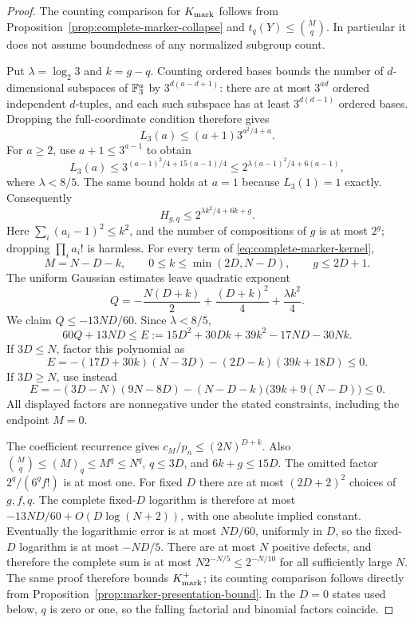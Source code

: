 \begin{proof}
The counting comparison for $K_{\rm mark}$ follows from
Proposition~\ref{prop:complete-marker-collapse} and
$t_q(Y)\leq\binom Mq$. In particular it does not assume boundedness
of any normalized subgroup count.

Put $\lambda=\log_2 3$ and $k=g-q$. Counting ordered bases bounds
the number of $d$-dimensional subspaces of $\mathbb F_3^a$ by
$3^{d(a-d+1)}$: there are at most $3^{ad}$ ordered independent
$d$-tuples, and each such subspace has at least $3^{d(d-1)}$
ordered bases. Dropping the full-coordinate condition therefore gives
\[
 L_3(a)\leq(a+1)3^{a^2/4+a}.
\]
For $a\geq2$, use $a+1\leq3^{a-1}$ to obtain
\[
 L_3(a)\leq3^{(a-1)^2/4+15(a-1)/4}
       \leq2^{\lambda(a-1)^2/4+6(a-1)},
\]
where $\lambda<8/5$. The same bound holds at $a=1$ because
$L_3(1)=1$ exactly.
Consequently
\[
 H_{g,q}\leq2^{\lambda k^2/4+6k+g}.
\]
Here $\sum_i(a_i-1)^2\leq k^2$, and the number of compositions of
$g$ is at most $2^g$; dropping $\prod_i a_i!$ is harmless.
For every term of \eqref{eq:complete-marker-kernel},
\[
 M=N-D-k,\qquad 0\leq k\leq\min(2D,N-D),\qquad g\leq2D+1.
\]
The uniform Gaussian estimates leave quadratic exponent
\[
 Q=-\frac{N(D+k)}2+\frac{(D+k)^2}4+\frac{\lambda k^2}4.
\]
We claim $Q\leq-13ND/60$. Since $\lambda<8/5$,
\[
 60Q+13ND\leq E:=15D^2+30Dk+39k^2-17ND-30Nk.
\]
If $3D\leq N$, factor this polynomial as
\[
 E=-(17D+30k)(N-3D)-(2D-k)(39k+18D)\leq0.
\]
If $3D\geq N$, use instead
\[
 E=-(3D-N)(9N-8D)-(N-D-k)\bigl(39k+9(N-D)\bigr)\leq0.
\]
All displayed factors are nonnegative under the stated constraints,
including the endpoint $M=0$.

The coefficient recurrence gives $c_M/p_n\leq(2N)^{D+k}$.
Also $\binom Mq\leq(M)_q\leq M^q\leq N^q$, $q\leq3D$, and
$6k+g\leq15D$.
The omitted factor $2^q/(6^gf!)$ is at most one. For fixed $D$
there are at most $(2D+2)^2$ choices of $g,f,q$. The complete
fixed-$D$ logarithm is therefore at most
$-13ND/60+O(D\log(N+2))$, with one absolute implied constant.
Eventually the logarithmic error is at most $ND/60$, uniformly in $D$,
so the fixed-$D$ logarithm is at most $-ND/5$.
There are at most $N$ positive defects, and therefore the complete sum
is at most $N2^{-N/5}\leq2^{-N/10}$ for all sufficiently large $N$.
The same proof therefore bounds $K_{\rm mark}^{+}$; its counting
comparison follows directly from
Proposition~\ref{prop:marker-presentation-bound}. In the $D=0$ states
used below, $q$ is zero or one, so the falling factorial and binomial
factors coincide.
\end{proof}

